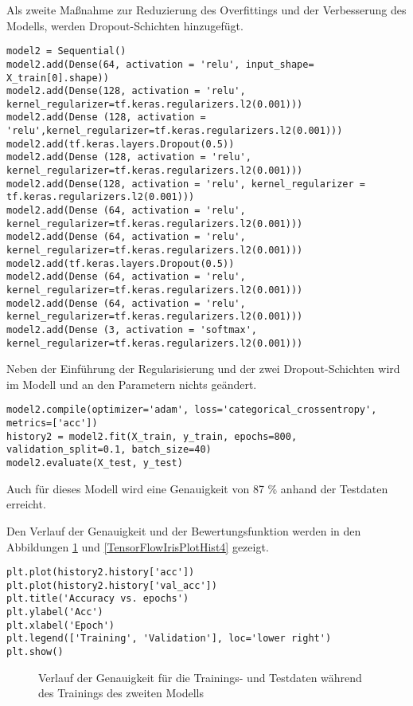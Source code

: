 Als zweite Maßnahme zur Reduzierung des Overfittings und der Verbesserung des Modells, werden Dropout-Schichten hinzugefügt.


\begin{verbatim}
model2 = Sequential()
model2.add(Dense(64, activation = 'relu', input_shape= X_train[0].shape))
model2.add(Dense(128, activation = 'relu', kernel_regularizer=tf.keras.regularizers.l2(0.001)))
model2.add(Dense (128, activation = 'relu',kernel_regularizer=tf.keras.regularizers.l2(0.001)))
model2.add(tf.keras.layers.Dropout(0.5))
model2.add(Dense (128, activation = 'relu', kernel_regularizer=tf.keras.regularizers.l2(0.001)))
model2.add(Dense(128, activation = 'relu', kernel_regularizer = tf.keras.regularizers.l2(0.001)))
model2.add(Dense (64, activation = 'relu', kernel_regularizer=tf.keras.regularizers.l2(0.001)))
model2.add(Dense (64, activation = 'relu', kernel_regularizer=tf.keras.regularizers.l2(0.001)))
model2.add(tf.keras.layers.Dropout(0.5))
model2.add(Dense (64, activation = 'relu', kernel_regularizer=tf.keras.regularizers.l2(0.001)))
model2.add(Dense (64, activation = 'relu', kernel_regularizer=tf.keras.regularizers.l2(0.001)))
model2.add(Dense (3, activation = 'softmax', kernel_regularizer=tf.keras.regularizers.l2(0.001)))
\end{verbatim}

Neben der Einführung der Regularisierung und der zwei Dropout-Schichten wird im Modell  und an den Parametern
nichts geändert. 

\begin{verbatim}
model2.compile(optimizer='adam', loss='categorical_crossentropy', metrics=['acc'])
history2 = model2.fit(X_train, y_train, epochs=800, validation_split=0.1, batch_size=40)
model2.evaluate(X_test, y_test)
\end{verbatim}

Auch für dieses Modell wird eine Genauigkeit von 87 \% anhand der Testdaten erreicht.

Den Verlauf der Genauigkeit und der Bewertungsfunktion werden in den Abbildungen \ref{TensorFlowIrisPlotHist3}
und \ref{TensorFlowIrisPlotHist4} gezeigt. 


\begin{verbatim}
plt.plot(history2.history['acc'])
plt.plot(history2.history['val_acc'])
plt.title('Accuracy vs. epochs')
plt.ylabel('Acc')
plt.xlabel('Epoch')
plt.legend(['Training', 'Validation'], loc='lower right')
plt.show()
\end{verbatim}


\begin{figure}[H]
	\caption{Verlauf der Genauigkeit für die Trainings- und Testdaten während des Trainings des zweiten Modells}
	\label{TensorFlowIrisPlotHist3}
\end{figure}


